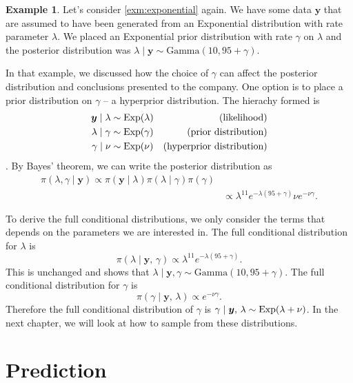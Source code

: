 \documentclass[
]{book}
\theoremstyle{definition}
\theoremstyle{definition}
\newtheorem{example}{Example}[chapter]
\theoremstyle{definition}
\theoremstyle{definition}
\theoremstyle{remark}
\begin{document}
\begin{example}
Let's consider \ref{exm:exponential} again. We have some data \(\boldsymbol{y}\) that are assumed to have been generated from an Exponential distribution with rate parameter \(\lambda\). We placed an Exponential prior distribution with rate \(\gamma\) on \(\lambda\) and the posterior distribution was \(\lambda \mid \boldsymbol{y} \sim \textrm{Gamma}(10, 95 + \gamma)\).

In that example, we discussed how the choice of \(\gamma\) can affect the posterior distribution and conclusions presented to the company. One option is to place a prior distribution on \(\gamma\) -- a hyperprior distribution. The hierachy formed is
\begin{align*}
\boldsymbol{y} \mid \lambda &\sim \hbox{Exp}(\lambda) & \textrm{(likelihood)} \\
\lambda \mid \gamma &\sim \hbox{Exp}(\gamma) & \textrm{(prior distribution)} \\
\gamma \mid \nu &\sim \hbox{Exp}(\nu) & \textrm{(hyperprior distribution)}  \\
\end{align*}.
By Bayes' theorem, we can write the posterior distribution as
\begin{align*}
\pi(\lambda, \gamma \mid \boldsymbol{y}) \propto \pi(\boldsymbol{y} \mid \lambda)\pi(\lambda \mid \gamma)\pi(\gamma)\\
&\propto \lambda^{11}e^{-\lambda(95 + \gamma)}\nu e^{-\nu\gamma}.
\end{align*}

To derive the full conditional distributions, we only consider the terms that depends on the parameters we are interested in. The full conditional distribution for \(\lambda\) is
\[
\pi(\lambda \mid \boldsymbol{y}, \,\gamma) \propto \lambda^{11}e^{-\lambda(95 + \gamma)}.
\]
This is unchanged and shows that \(\lambda \mid \boldsymbol{y}, \gamma \sim \textrm{Gamma}(10, 95 + \gamma)\). The full conditional distribution for \(\gamma\) is
\[
\pi(\gamma \mid \boldsymbol{y}, \,\lambda) \propto e^{-\nu\gamma}.
\]
Therefore the full conditional distribution of \(\gamma\) is \(\gamma \mid \boldsymbol{y}, \,\lambda \sim \hbox{Exp}(\lambda + \nu)\).
In the next chapter, we will look at how to sample from these distributions.
\end{example}

\hypertarget{prediction}{%
\section{Prediction}\label{prediction}}
\end{document}
